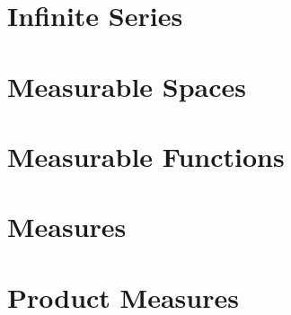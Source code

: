 \begingroup
    \ifcsname\PATH\endcsname
        \newcommand{\PATH}{books/Analysis/Measure_Theory}
        \newcommand{\OLDPATH}{\PATH}
    \else
        \newcommand{\OLDPATH}{\PATH}
        \renewcommand{\PATH}{books/Analysis/Measure_Theory}
    \fi
    \chapter{Infinite Series}
        
    \chapter{Measurable Spaces}
        
        
        
        
        
        
    \chapter{Measurable Functions}
        
        
    \chapter{Measures}
        
        
    \chapter{Product Measures}
        
    \renewcommand{\PATH}{\OLDPATH}
\endgroup